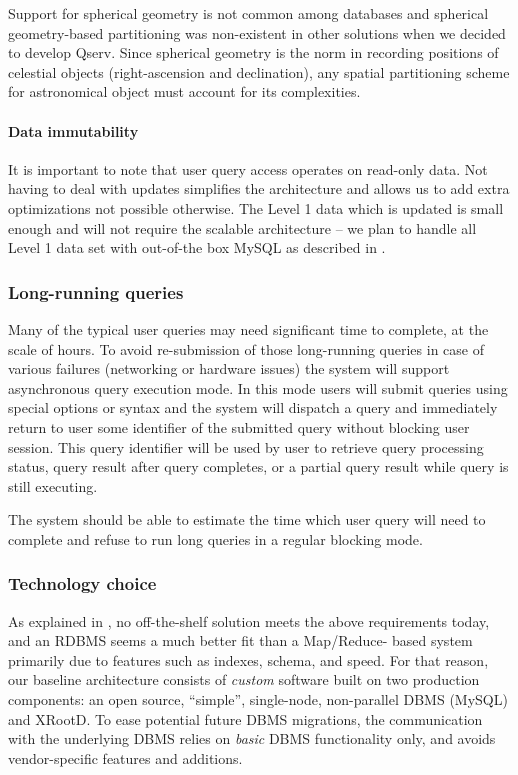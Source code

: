 \documentclass[DM,lsstdraft,toc]{lsstdoc}
\begin{document}
Support for spherical geometry is not common among databases and
spherical geometry-based partitioning was non-existent in other
solutions when we decided to develop Qserv. Since spherical geometry is
the norm in recording positions of celestial objects (right-ascension
and declination), any spatial partitioning scheme for astronomical
object must account for its complexities.

\paragraph{Data immutability}\label{data-immutability}

It is important to note that user query access operates on read-only
data. Not having to deal with updates simplifies the architecture and
allows us to add extra optimizations not possible otherwise. The Level 1
data which is updated is small enough and will not require the scalable
architecture -- we plan to handle all Level 1 data set with out-of-the
box MySQL as described in .

\subsubsection{Long-running queries}\label{long-running-queries}

Many of the typical user queries may need significant time to complete,
at the scale of hours. To avoid re-submission of those long-running
queries in case of various failures (networking or hardware issues) the
system will support asynchronous query execution mode. In this mode
users will submit queries using special options or syntax and the system
will dispatch a query and immediately return to user some identifier of
the submitted query without blocking user session. This query identifier
will be used by user to retrieve query processing status, query result
after query completes, or a partial query result while query is still
executing.

The system should be able to estimate the time which user query will
need to complete and refuse to run long queries in a regular blocking
mode.

\subsubsection{Technology choice}\label{technology-choice}

As explained in , no off-the-shelf solution meets the above
requirements today, and an RDBMS seems a much better fit than a Map/Reduce-
based system primarily due to features such as indexes, schema, and speed. For
that reason, our baseline architecture consists of \emph{custom} software
built on two production components: an open source, ``simple'', single-node,
non-parallel DBMS (MySQL) and XRootD. To ease potential future DBMS
migrations, the communication with the underlying DBMS relies on \emph{basic}
DBMS functionality only, and avoids vendor-specific features and additions.
\end{document}
